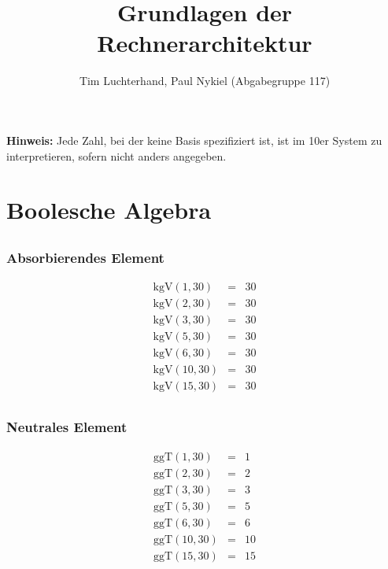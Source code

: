 \documentclass[DIN, pagenumber=false, fontsize=11pt, parskip=half]{scrartcl}
\title{Grundlagen der Rechnerarchitektur}
\author{Tim Luchterhand, Paul Nykiel (Abgabegruppe 117)}
\newcommand{\boolshitKgV}[1]{\text{kgV}(#1,30) &=& 30\\}
\newcommand{\boolshitggT}[1]{\text{ggT}(#1,30) &=& #1\\}
\begin{document}
    \maketitle
    \textbf{Hinweis: } Jede Zahl, bei der keine Basis spezifiziert ist, ist im 10er System zu interpretieren, sofern nicht anders angegeben.
    \section{Boolesche Algebra}
    \subsection{}
    \subsubsection{Absorbierendes Element}
    \begin{eqnarray*}
        \boolshitKgV{1}
        \boolshitKgV{2}
        \boolshitKgV{3}
        \boolshitKgV{5}
        \boolshitKgV{6}
        \boolshitKgV{10}
        \boolshitKgV{15}
    \end{eqnarray*}
    \subsubsection{Neutrales Element}
    \begin{eqnarray*}
        \boolshitggT{1}
        \boolshitggT{2}
        \boolshitggT{3}
        \boolshitggT{5}
        \boolshitggT{6}
        \boolshitggT{10}
        \boolshitggT{15}
    \end{eqnarray*}
\end{document}
